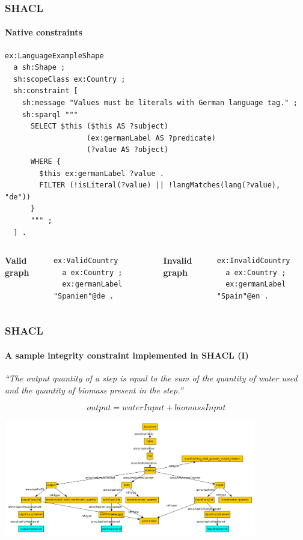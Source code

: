 \documentclass{beamer}
\begin{document}
\begin{frame}[fragile]
  \frametitle{SHACL}
  \framesubtitle{Native constraints}

  \begin{Verbatim}[fontsize=\scriptsize]
ex:LanguageExampleShape
  a sh:Shape ;
  sh:scopeClass ex:Country ;
  sh:constraint [
    sh:message "Values must be literals with German language tag." ;
    sh:sparql """
      SELECT $this ($this AS ?subject)
                   (ex:germanLabel AS ?predicate)
                   (?value AS ?object)
      WHERE {
        $this ex:germanLabel ?value .
        FILTER (!isLiteral(?value) || !langMatches(lang(?value), "de"))
      }
      """ ;
  ] .
  \end{Verbatim}

  \pause

  \begin{columns}[t]

    \textbf{Valid graph}

    \begin{Verbatim}[fontsize=\footnotesize]
ex:ValidCountry
  a ex:Country ;
  ex:germanLabel "Spanien"@de .
    \end{Verbatim}


    \textbf{Invalid graph}

    \begin{Verbatim}[fontsize=\footnotesize, formatcom=\color{red}]
ex:InvalidCountry
  a ex:Country ;
  ex:germanLabel "Spain"@en .
    \end{Verbatim}
  \end{columns}
\end{frame}

\begin{frame}
  \frametitle{SHACL}
  \framesubtitle{A sample integrity constraint implemented in SHACL (I)}

  \vspace{0.5cm}

  \textit{``The output quantity of a step is equal to the sum of the quantity
  of water used and the quantity of biomass present in the step.''}

  $$output = waterInput + biomassInput$$

  \begin{center}
    \includegraphics[width=11cm]{underlying-graph.png}
  \end{center}
\end{frame}
\end{document}
